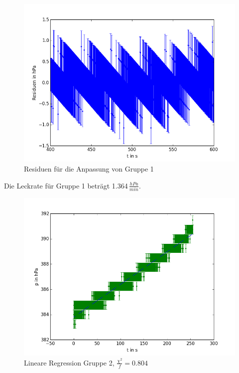 \documentclass[12pt,a4paper]{article}
\begin{document}
\begin{figure}[H]
\centering
\includegraphics[scale=0.5]{Bilder/residuen_dichtigkeit_JM.png}
\caption{Residuen für die Anpassung von Gruppe 1}
\end{figure}

Die Leckrate für Gruppe 1 beträgt 1.364$\,\frac{hPa}{min}$.
\newpage

\begin{figure}[H]
\centering
\includegraphics[scale=0.5]{Bilder/dichtigkeit__EL.png}
\caption{Lineare Regression Gruppe 2, $\frac{\chi^2}{f}=0.804$}
\end{figure}
\end{document}
